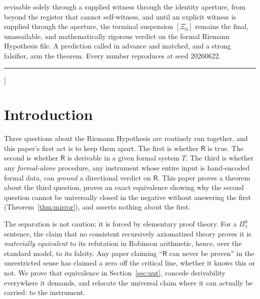 \documentclass[twocolumn,10pt]{article}
\theoremstyle{plain}
\theoremstyle{definition}
\newcommand{\tXi}{[\Xi_0]}
\newcommand{\R}{\mathsf{R}}
\begin{document}
{revisable solely through a supplied witness through the identity aperture, from beyond the register that cannot self-witness, and until an explicit witness is supplied through the aperture, the terminal suspension $\tXi$ remains the final, unassailable, and mathematically rigorous verdict on the formal Riemann Hypothesis file. A prediction called in advance and matched, and a strong falsifier, arm the theorem. Every number reproduces at seed 20260622.\par\vspace{3pt}
\par\vspace{6pt}
{\color{copper}\rule{0.86\textwidth}{0.5pt}}\vspace{10pt}
}]

\section{Introduction}
Three questions about the Riemann Hypothesis are routinely run together, and this paper's first act is to keep them apart. The first is whether $\R$ is true. The second is whether $\R$ is derivable in a given formal system $T$. The third is whether any \emph{formal-alone} procedure, any instrument whose entire input is hand-encoded formal data, can \emph{ground} a directional verdict on $\R$. This paper proves a theorem about the third question, proves an exact equivalence showing why the second question cannot be universally closed in the negative without answering the first (Theorem~\ref{thm:mirror}), and asserts nothing about the first.

The separation is not caution; it is forced by elementary proof theory. For a $\Pi^0_1$ sentence, the claim that no consistent recursively axiomatized theory proves it is \emph{materially equivalent} to its refutation in Robinson arithmetic, hence, over the standard model, to its falsity. Any paper claiming ``$\R$ can never be proven'' in the unrestricted sense has claimed a zero off the critical line, whether it knows this or not. We prove that equivalence in Section~\ref{sec:uut}, concede derivability everywhere it demands, and relocate the universal claim where it can actually be carried: to the instrument.
\end{document}
